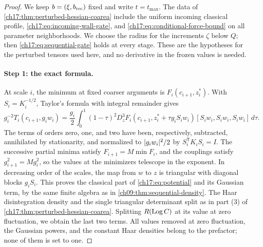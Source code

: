 \begin{proof}
We keep $b=(\xi,b_{\mathrm{rec}})$ fixed and write $t=t_{\max}$. The data of \cref{ch17:thm:perturbed-hessian-coarea} include the uniform incoming classical profile, \eqref{ch17:eq:incoming-wall-gate}, and \eqref{ch17:eq:conditional-force-bound} on all parameter neighborhoods. We choose the radius for the increments $\zeta$ below $Q$; then \eqref{ch17:eq:sequential-gate} holds at every stage. These are the hypotheses for the perturbed tensors used here, and no derivative in the frozen values is needed.

\paragraph{Step 1: the exact formula.}
At scale $i$, the minimum at fixed coarser arguments is $F_i(c_{i+1},z_i^*)$. With $S_i=K_i^{-1/2}$, Taylor's formula with integral remainder gives
\begin{equation}\label{ch17:eq:cubic-remainder}
 g_i^{-2}T_i(c_{i+1},g_iw_i)=\frac{g_i}2\int_0^1(1-\tau)^2D_z^3F_i(c_{i+1},z_i^*+\tau g_iS_iw_i)[S_iw_i,S_iw_i,S_iw_i]\,d\tau.
\end{equation}
The terms of orders zero, one, and two have been, respectively, subtracted, annihilated by stationarity, and normalized to $\lvert g_iw_i\rvert^2/2$ by $S_i^{\mathsf T}K_iS_i=I$. The successive partial minima satisfy $F_{i+1}=M\min F_i$, and the couplings satisfy $g_{i+1}^2=Mg_i^2$, so the values at the minimizers telescope in the exponent. In decreasing order of the scales, the map from $w$ to $z$ is triangular with diagonal blocks $g_iS_i$. This proves the classical part of \eqref{ch17:eq:potential} and its Gaussian term, by the same finite algebra as in \cref{ch09:thm:sequential-density}. The Haar disintegration density and the single triangular determinant split as in part (3) of \cref{ch17:thm:perturbed-hessian-coarea}. Splitting $R(\operatorname{Log} C)$ at its value at zero fluctuation, we obtain the last two terms. All values removed at zero fluctuation, the Gaussian powers, and the constant Haar densities belong to the prefactor; none of them is set to one.


\end{proof}
